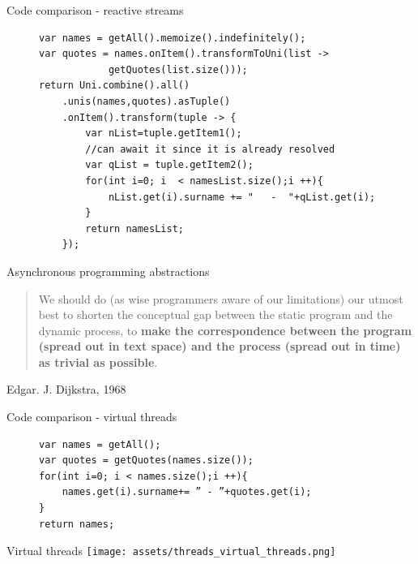 \documentclass{beamer}
\begin{document}
\begin{frame}[fragile]{Code comparison - reactive streams}
    \begin{figure}
        \begin{lstlisting}
var names = getAll().memoize().indefinitely();
var quotes = names.onItem().transformToUni(list -> 
            getQuotes(list.size()));
return Uni.combine().all()
    .unis(names,quotes).asTuple()
    .onItem().transform(tuple -> {
        var nList=tuple.getItem1();
        //can await it since it is already resolved
        var qList = tuple.getItem2();
        for(int i=0; i  < namesList.size();i ++){
            nList.get(i).surname += "   -  "+qList.get(i);
        }
        return namesList;
    });
        \end{lstlisting}
    \end{figure}
\end{frame}
\begin{frame}{Asynchronous programming abstractions}
    \begin{quote}
        We should do (as wise programmers aware of our limitations) our utmost best to shorten the conceptual gap between the static program and the dynamic process, to \textbf{make the correspondence between the program (spread out in text space) and the process (spread out in time) as trivial as possible}.
    \end{quote}
    Edgar. J. Dijkstra, 1968
\end{frame}
\begin{frame}[fragile]{Code comparison - virtual threads}
    \begin{figure}
        \begin{lstlisting}
var names = getAll();
var quotes = getQuotes(names.size());
for(int i=0; i < names.size();i ++){
    names.get(i).surname+= ” - ”+quotes.get(i);
}
return names;
        \end{lstlisting}
    \end{figure}
\end{frame}
\begin{frame}{Virtual threads}
    \texttt{[image: assets/threads\_virtual\_threads.png]}
\end{frame}
\end{document}

